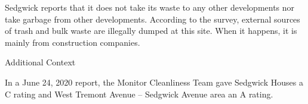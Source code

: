Sedgwick reports that it does not take its waste to any other developments nor take garbage from other developments.  According to the survey, external sources of trash and bulk waste are illegally dumped at this site. When it happens, it is mainly from construction companies.



Additional Context



In a June 24, 2020 report, the Monitor Cleanliness Team gave Sedgwick Houses a C rating and West Tremont Avenue -- Sedgwick Avenue area an A rating.